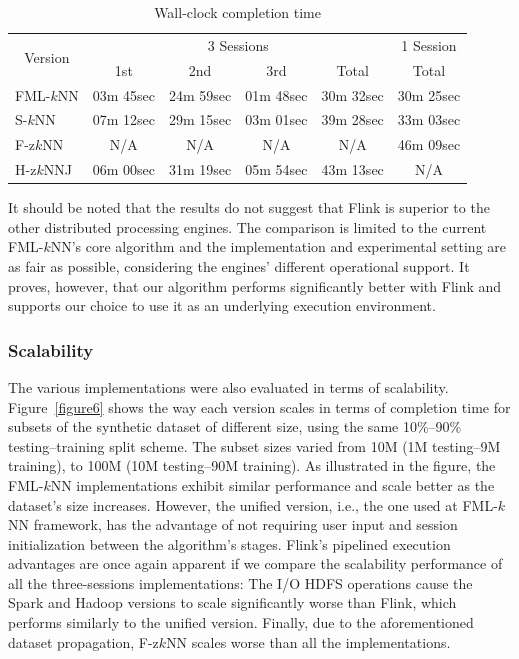 \begin{table}[!ht]
\centering
\caption{Wall-clock completion time}
\label{table1}
\begin{tabular}{l|c|c|c|c||c}
\multicolumn{1}{c|}{\multirow{2}{*}{Version}} & \multicolumn{4}{c||}{3 Sessions}             & 1 Session  \\ \cline{2-6} 
\multicolumn{1}{c|}{}                         & 1st      & 2nd      & 3rd      & Total    & Total    \\ \hline
FML-$k$NN                                         & 03m 45sec & 24m 59sec & 01m 48sec & 30m 32sec & 30m 25sec \\ \hline
S-$k$NN                                         & 07m 12sec & 29m 15sec & 03m 01sec & 39m 28sec & 33m 03sec \\ \hline
F-z$k$NN                                         & N/A & N/A & N/A & N/A & 46m 09sec \\ \hline
H-z$k$NNJ                                       & 06m 00sec & 31m 19sec & 05m 54sec & 43m 13sec & N/A     
\end{tabular}
\end{table}

It should be noted that the results do not suggest that Flink is superior to the other distributed processing engines. The comparison is limited to the current FML-$k$NN's core algorithm and the implementation and experimental setting are as fair as possible, considering the engines' different operational support. It proves, however, that our algorithm performs significantly better with Flink and supports our choice to use it as an underlying execution environment.

\subsubsection{Scalability}
\label{subsubsec:scalability}
The various implementations were also evaluated in terms of scalability. Figure~\ref{figure6} shows the way each version scales in terms of completion time for subsets of the synthetic dataset of different size, using the same 10\%--90\% testing--training split scheme. The subset sizes varied from 10M (1M testing--9M training), to 100M (10M testing--90M training). As illustrated in the figure, the FML-$k$NN implementations exhibit similar performance and scale better as the dataset's size increases. However, the unified version, i.e., the one used at FML-$k$NN framework, has the advantage of not requiring user input and session initialization between the algorithm's stages. Flink's pipelined execution advantages are once again apparent if we compare the scalability performance of all the three-sessions implementations: The I/O HDFS operations cause the Spark and Hadoop versions to scale significantly worse than Flink, which performs similarly to the unified version. Finally, due to the aforementioned dataset propagation, F-z$k$NN scales worse than all the implementations.

